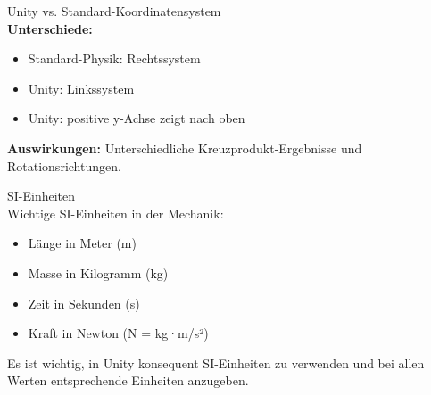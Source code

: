 \begin{example2}{Unity vs. Standard-Koordinatensystem}\\
    \textbf{Unterschiede:}
    \begin{itemize}
        \item Standard-Physik: Rechtssystem
        \item Unity: Linkssystem
        \item Unity: positive y-Achse zeigt nach oben
    \end{itemize}
    
    \textbf{Auswirkungen:} Unterschiedliche Kreuzprodukt-Ergebnisse und Rotationsrichtungen.
\end{example2}

\begin{definition}{SI-Einheiten}\\
    Wichtige SI-Einheiten in der Mechanik:
    \begin{itemize}
        \item Länge in Meter (m)
        \item Masse in Kilogramm (kg)
        \item Zeit in Sekunden (s)
        \item Kraft in Newton (N = kg·m/s²)
    \end{itemize}
    Es ist wichtig, in Unity konsequent SI-Einheiten zu verwenden und bei allen Werten entsprechende Einheiten anzugeben.
\end{definition}

